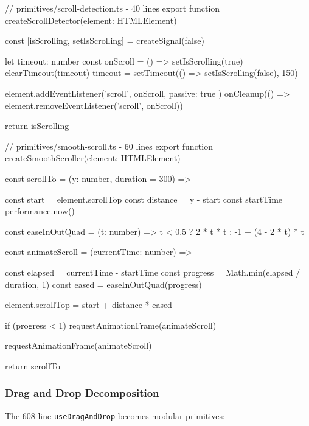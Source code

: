 \documentclass[11pt]{article}
\begin{document}
\begin{typescriptcode}
// primitives/scroll-detection.ts - 40 lines
export function createScrollDetector(element: HTMLElement) {
  const [isScrolling, setIsScrolling] = createSignal(false)
  
  let timeout: number
  const onScroll = () => {
    setIsScrolling(true)
    clearTimeout(timeout)
    timeout = setTimeout(() => setIsScrolling(false), 150)
  }
  
  element.addEventListener('scroll', onScroll, { passive: true })
  onCleanup(() => element.removeEventListener('scroll', onScroll))
  
  return { isScrolling }
}

// primitives/smooth-scroll.ts - 60 lines  
export function createSmoothScroller(element: HTMLElement) {
  const scrollTo = (y: number, duration = 300) => {
    const start = element.scrollTop
    const distance = y - start
    const startTime = performance.now()
    
    const easeInOutQuad = (t: number) => 
      t < 0.5 ? 2 * t * t : -1 + (4 - 2 * t) * t
    
    const animateScroll = (currentTime: number) => {
      const elapsed = currentTime - startTime
      const progress = Math.min(elapsed / duration, 1)
      const eased = easeInOutQuad(progress)
      
      element.scrollTop = start + distance * eased
      
      if (progress < 1) {
        requestAnimationFrame(animateScroll)
      }
    }
    
    requestAnimationFrame(animateScroll)
  }
  
  return { scrollTo }
}
\end{typescriptcode}

\subsubsection{Drag and Drop Decomposition}

The 608-line \texttt{useDragAndDrop} becomes modular primitives:
\end{document}

